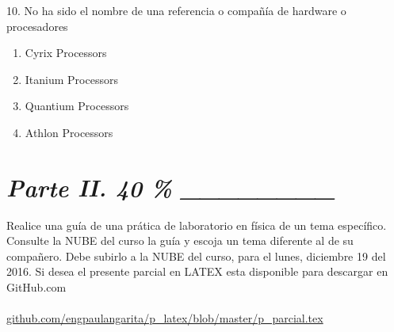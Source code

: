 \documentclass{article}
\begin{document}
10. No ha sido el nombre de una referencia o compañía de hardware o procesadores

\begin{enumerate}[label=(\Alph*)]
\item Cyrix Processors
\item Itanium Processors
\item Quantium Processors
\item Athlon Processors
\end{enumerate} 



\section{\textit{Parte II. 40 \% \_\_\_\_\_\_\_\_}}

Realice una guía de una prática de laboratorio en física de un tema específico. Consulte la NUBE del curso la guía y escoja un tema diferente al de su compañero. Debe subirlo a la NUBE del curso, para el lunes, diciembre 19 del 2016. Si desea el presente parcial en LATEX esta disponible para descargar en GitHub.com\\
\\

\url{github.com/engpaulangarita/p_latex/blob/master/p_parcial.tex}









\end{document}

